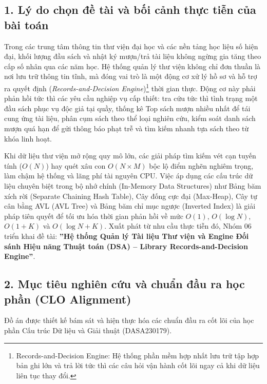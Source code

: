 \documentclass[14pt,a4paper]{extarticle}
\begin{document}
\subsection*{1. Lý do chọn đề tài và bối cảnh thực tiễn của bài toán}

Trong các trung tâm thông tin thư viện đại học và các nền tảng học liệu số hiện đại, khối lượng đầu sách và nhật ký mượn/trả tài liệu không ngừng gia tăng theo cấp số nhân qua các năm học. Hệ thống quản lý thư viện không chỉ đơn thuần là nơi lưu trữ thông tin tĩnh, mà đóng vai trò là một động cơ xử lý hồ sơ và hỗ trợ ra quyết định (\textit{Records-and-Decision Engine})\footnote{Records-and-Decision Engine: Hệ thống phần mềm hợp nhất lưu trữ tập hợp bản ghi lớn và trả lời tức thì các câu hỏi vận hành cốt lõi ngay cả khi dữ liệu liên tục thay đổi.} thời gian thực. Động cơ này phải phản hồi tức thì các yêu cầu nghiệp vụ cấp thiết: tra cứu tức thì tình trạng một đầu sách phục vụ độc giả tại quầy, thống kê Top sách mượn nhiều nhất để tái cung ứng tài liệu, phân cụm sách theo thể loại nghiên cứu, kiểm soát danh sách mượn quá hạn để gửi thông báo phạt trễ và tìm kiếm nhanh tựa sách theo từ khóa linh hoạt.

Khi dữ liệu thư viện mở rộng quy mô lớn, các giải pháp tìm kiếm vét cạn tuyến tính ($O(N)$) hay quét xâu con $O(N \times M)$ bộc lộ điểm nghẽn nghiêm trọng, làm chậm hệ thống và lãng phí tài nguyên CPU. Việc áp dụng các cấu trúc dữ liệu chuyên biệt trong bộ nhớ chính (In-Memory Data Structures) như Bảng băm xích rời (Separate Chaining Hash Table), Cây đống cực đại (Max-Heap), Cây tự cân bằng AVL (AVL Tree) và Bảng băm chỉ mục ngược (Inverted Index) là giải pháp tiên quyết để tối ưu hóa thời gian phản hồi về mức $O(1)$, $O(\log N)$, $O(1+K)$ và $O(\log N + K)$. Xuất phát từ nhu cầu thực tiễn đó, Nhóm 06 triển khai đề tài: \textbf{''Hệ thống Quản lý Tài liệu Thư viện và Engine Đối sánh Hiệu năng Thuật toán (DSA) -- Library Records-and-Decision Engine''}.

\subsection*{2. Mục tiêu nghiên cứu và chuẩn đầu ra học phần (CLO Alignment)}

Đồ án được thiết kế bám sát và hiện thực hóa các chuẩn đầu ra cốt lõi của học phần Cấu trúc Dữ liệu và Giải thuật (DASA230179).
\end{document}
